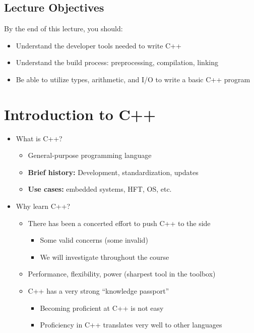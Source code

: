 \documentclass{article}
\title{}
\author{Ryan Baker}
\date{\today}
\begin{document}
\maketitle
\tableofcontents
\pagebreak

\subsection*{Lecture Objectives}

\noindent
By the end of this lecture, you should:
\begin{itemize}
	\item Understand the developer tools needed to write C++
	\item Understand the build process: preprocessing, compilation, linking
	\item Be able to utilize types, arithmetic, and I/O to write a basic C++ program
\end{itemize}

\section{Introduction to C++}

\begin{itemize}
	\item What is C++?
	\begin{itemize}
		\item General-purpose programming language
		\item \textbf{Brief history:} Development, standardization, updates
		\item \textbf{Use cases:} embedded systems, HFT, OS, etc.
	\end{itemize}
	\item Why learn C++?
	\begin{itemize}
		\item There has been a concerted effort to push C++ to the side \begin{itemize}
			\item Some valid concerns (some invalid)
			\item We will investigate throughout the course
		\end{itemize}
		\item Performance, flexibility, power (sharpest tool in the toolbox)
		\item C++ has a very strong ``knowledge passport'' \begin{itemize}
			\item Becoming proficient at C++ is not easy
			\item Proficiency in C++ translates very well to other languages
		\end{itemize}
	\end{itemize}
\end{itemize}
\end{document}
